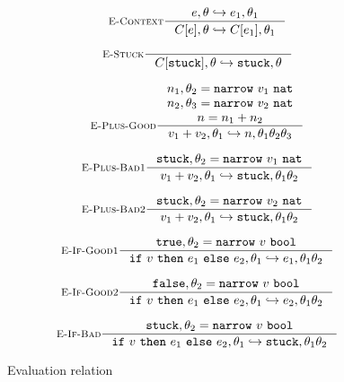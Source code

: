 \begin{figure}
$$
\inference[\recontext]{\stepsto{e, \su}{e_1, \su_1}}{\stepsto{C[e], \su}{C[e_1], \su_1}}
$$

$$
\inference[\restuck]{}{\stepsto{C[\stuck], \su}{\stuck, \su}}
$$

$$
\inference[\replusgood]
  {n_1, \su_2 = \force{v_1}{\tnat} \\
   n_2, \su_3 = \force{v_2}{\tnat} \\ 
   n = \eplus{n_1}{n_2}}
  {\stepsto{\eplus{v_1}{v_2}, \su_1}{n, \su_1\su_2\su_3}}
$$

$$
\inference[\replusbadone]
  {\stuck, \su_2 = \force{v_1}{\tnat}}
  {\stepsto{\eplus{v_1}{v_2}, \su_1}{\stuck, \su_1\su_2}}
$$

$$
\inference[\replusbadtwo]
  {\stuck, \su_2 = \force{v_2}{\tnat}}
  {\stepsto{\eplus{v_1}{v_2}, \su_1}{\stuck, \su_1\su_2}}
$$

$$
\inference[\reifgoodone]
  {\etrue, \su_2 = \force{v}{\tbool}}
  {\stepsto{\eif{v}{e_1}{e_2}, \su_1}{e_1, \su_1\su_2}}
$$

$$
\inference[\reifgoodtwo]
  {\efalse, \su_2 = \force{v}{\tbool}}
  {\stepsto{\eif{v}{e_1}{e_2}, \su_1}{e_2, \su_1\su_2}}
$$

$$
\inference[\reifbad]
  {\stuck, \su_2 = \force{v}{\tbool}}
  {\stepsto{\eif{v}{e_1}{e_2}, \su_1}{\stuck, \su_1\su_2}}
$$
\caption{Evaluation relation}
\label{fig:evaluation}
\end{figure}
